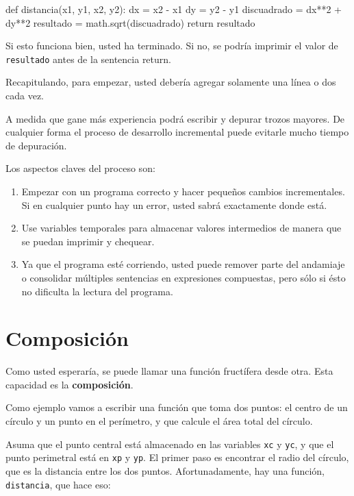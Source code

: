 \beforeverb
\begin{pythoncode}
def distancia(x1, y1, x2, y2):
  dx = x2 - x1
  dy = y2 - y1
  discuadrado = dx**2 + dy**2
  resultado = math.sqrt(discuadrado)
  return resultado
\end{pythoncode}
\afterverb
%

Si esto funciona bien, usted ha terminado.  Si no, se podría
imprimir el valor de  \texttt{resultado} antes de la sentencia return.

Recapitulando, para empezar, usted debería agregar solamente una línea o dos cada vez.

A medida que gane más experiencia  podrá escribir y depurar trozos
mayores. De cualquier forma el proceso de desarrollo incremental
puede evitarle mucho tiempo de depuración.

Los aspectos claves del proceso son:

\begin{enumerate}
	\item Empezar con un programa correcto y hacer pequeños cambios 
	incrementales.
	Si en cualquier punto hay un error, usted sabrá exactamente donde está.
	
	\item Use variables temporales para almacenar valores intermedios de manera
	que se puedan imprimir y chequear.
	
	\item Ya que el programa esté corriendo, usted puede remover parte del 
	andamiaje o consolidar múltiples sentencias en expresiones compuestas, 
	pero sólo si ésto no dificulta la lectura del programa.
\end{enumerate}


\section{Composición}

Como usted esperaría, se puede llamar una función fructífera
desde otra. Esta capacidad es la {\bf composición}.

Como ejemplo vamos a escribir una función que toma dos puntos:
el centro de  un círculo y un punto en el perímetro, y que 
calcule el área total del círculo.

Asuma que el punto central está almacenado en las variables \texttt{xc} y
\texttt{yc}, y que el punto perimetral está en \texttt{xp} y \texttt{yp}. El
primer paso es encontrar el radio del círculo, que es la distancia
entre los dos puntos. Afortunadamente, hay una función, {\tt
distancia}, que hace eso:

